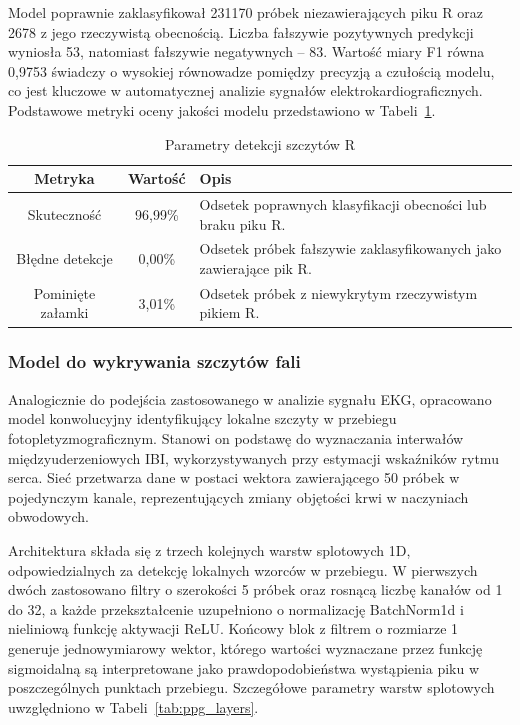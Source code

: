 \documentclass[journal]{IEEEtran}
\begin{document}
Model poprawnie zaklasyfikował 231170 próbek niezawierających piku R oraz 2678 z jego rzeczywistą obecnością. Liczba fałszywie pozytywnych predykcji wyniosła 53, natomiast fałszywie negatywnych -- 83. Wartość miary F1 równa 0,9753 świadczy o wysokiej równowadze pomiędzy precyzją a czułością modelu, co jest kluczowe w automatycznej analizie sygnałów elektrokardiograficznych. Podstawowe metryki oceny jakości modelu przedstawiono w Tabeli~\ref{tab:metrics}.

\begin{table}[ht]
\centering
\caption{Parametry detekcji szczytów R}
\label{tab:metrics}
\begin{tabular}{|c|c|p{4.6cm}|}
\hline
\textbf{Metryka} & \textbf{Wartość} & \textbf{Opis} \\
\hline
Skuteczność & 96,99\% & Odsetek poprawnych klasyfikacji obecności lub braku piku R. \\
\hline
Błędne detekcje & 0,00\% & Odsetek próbek fałszywie zaklasyfikowanych jako zawierające pik R. \\
\hline
Pominięte załamki & 3,01\% & Odsetek próbek z niewykrytym rzeczywistym pikiem R. \\
\hline
\end{tabular}
\end{table}

\newpage
\subsubsection{Model do wykrywania szczytów fali}
Analogicznie do podejścia zastosowanego w analizie sygnału EKG, opracowano model konwolucyjny identyfikujący lokalne szczyty w przebiegu fotopletyzmograficznym. Stanowi on podstawę do wyznaczania interwałów międzyuderzeniowych IBI, wykorzystywanych przy estymacji wskaźników rytmu serca. Sieć przetwarza dane w postaci wektora zawierającego 50 próbek w pojedynczym kanale, reprezentujących zmiany objętości krwi w naczyniach obwodowych.

Architektura składa się z trzech kolejnych warstw splotowych 1D, odpowiedzialnych za detekcję lokalnych wzorców w przebiegu. W pierwszych dwóch zastosowano filtry o szerokości 5 próbek oraz rosnącą liczbę kanałów od 1 do 32, a każde przekształcenie uzupełniono o normalizację BatchNorm1d i nieliniową funkcję aktywacji ReLU. Końcowy blok z filtrem o rozmiarze 1 generuje jednowymiarowy wektor, którego wartości wyznaczane przez funkcję sigmoidalną są interpretowane jako prawdopodobieństwa wystąpienia piku w poszczególnych punktach przebiegu. Szczegółowe parametry warstw splotowych uwzględniono w Tabeli~\ref{tab:ppg_layers}.
\end{document}
